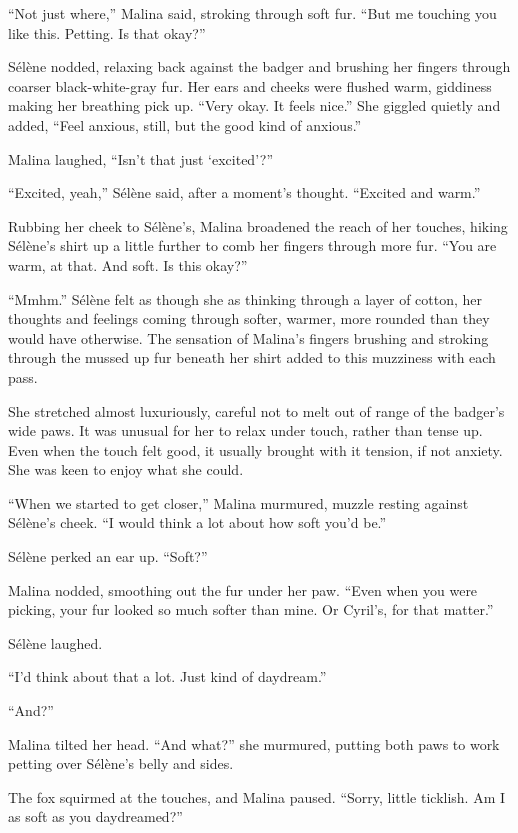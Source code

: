 ``Not just where,'' Malina said, stroking through soft fur. ``But me touching you like this. Petting. Is that okay?''

Sélène nodded, relaxing back against the badger and brushing her fingers through coarser black-white-gray fur. Her ears and cheeks were flushed warm, giddiness making her breathing pick up. ``Very okay. It feels nice.'' She giggled quietly and added, ``Feel anxious, still, but the good kind of anxious.''

Malina laughed, ``Isn't that just `excited'?''

``Excited, yeah,'' Sélène said, after a moment's thought. ``Excited and warm.''

Rubbing her cheek to Sélène's, Malina broadened the reach of her touches, hiking Sélène's shirt up a little further to comb her fingers through more fur. ``You are warm, at that. And soft. Is this okay?''

``Mmhm.'' Sélène felt as though she as thinking through a layer of cotton, her thoughts and feelings coming through softer, warmer, more rounded than they would have otherwise. The sensation of Malina's fingers brushing and stroking through the mussed up fur beneath her shirt added to this muzziness with each pass.

She stretched almost luxuriously, careful not to melt out of range of the badger's wide paws. It was unusual for her to relax under touch, rather than tense up. Even when the touch felt good, it usually brought with it tension, if not anxiety. She was keen to enjoy what she could.

``When we started to get closer,'' Malina murmured, muzzle resting against Sélène's cheek. ``I would think a lot about how soft you'd be.''

Sélène perked an ear up. ``Soft?''

Malina nodded, smoothing out the fur under her paw. ``Even when you were picking, your fur looked so much softer than mine. Or Cyril's, for that matter.''

Sélène laughed.

``I'd think about that a lot. Just kind of daydream.''

``And?''

Malina tilted her head. ``And what?'' she murmured, putting both paws to work petting over Sélène's belly and sides.

The fox squirmed at the touches, and Malina paused. ``Sorry, little ticklish. Am I as soft as you daydreamed?''

